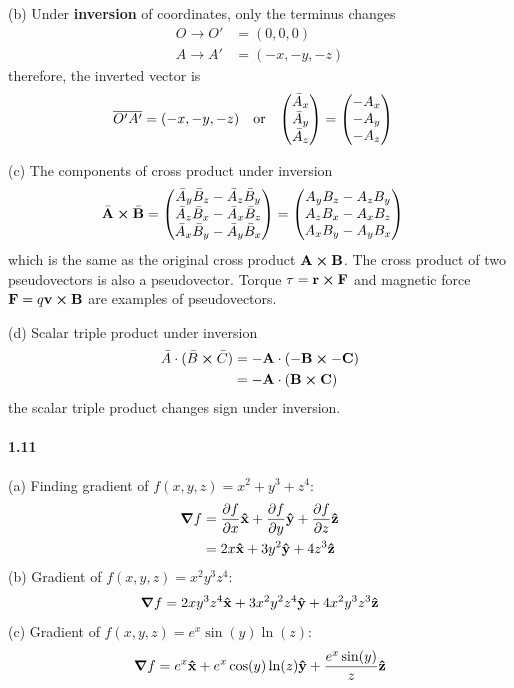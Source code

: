 \documentclass[../main.tex]{subfiles}
\begin{document}
(b) Under \textbf{inversion} of coordinates, only the terminus changes
\begin{align*}
    O \to O' &= (0, 0, 0) \\
    A \to A' &= (-x, -y, -z)
\end{align*}
therefore, the inverted vector is
\begin{align*}
    \overline{O'A'} = (-x, -y, -z) \qor \mqty(\bar{A}_x \\ \bar{A}_y \\ \bar{A}_z) &=
        \mqty(-A_x \\ -A_y \\ -A_z)
\end{align*}

(c) The components of cross product under inversion
\begin{align*}
    \bar{\vb{A}} \cross \bar{\vb{B}} &= 
    \begin{pmatrix}
        \bar{A}_y \bar{B}_z - \bar{A}_z \bar{B}_y \\
        \bar{A}_z \bar{B}_x - \bar{A}_x \bar{B}_z \\
        \bar{A}_x \bar{B}_y - \bar{A}_y \bar{B}_x
    \end{pmatrix}
    =
    \begin{pmatrix}
        A_y B_z - A_z B_y \\
        A_z B_x - A_x B_z \\
        A_x B_y - A_y B_x
    \end{pmatrix}
\end{align*}
which is the same as the original cross product $\vb{A} \cross \vb{B}$. The cross product of two
pseudovectors is also a pseudovector. Torque $\vb{\tau} = \vb{r} \cross \vb{F}$ and magnetic force
$\vb{F} = q \vb{v} \cross \vb{B}$ are examples of pseudovectors.

(d) Scalar triple product under inversion
\begin{align*}
    \bar{A} \cdot (\bar{B} \cross \bar{C}) &= -\vb{A} \cdot (-\vb{B} \cross -\vb{C}) \\
    &= -\vb{A} \cdot (\vb{B} \cross \vb{C})
\end{align*}
the scalar triple product changes sign under inversion.

\paragraph{1.11}
(a) Finding gradient of $f(x, y, z) = x^2 + y^3 + z^4$:
\begin{align*}
    \grad{f} &= \pdv{f}{x} \vu{x} + \pdv{f}{y} \vu{y} + \pdv{f}{z} \vu{z} \\
    &= 2x \vu{x} + 3y^2 \vu{y} + 4z^3 \vu{z}
\end{align*}
(b) Gradient of $f(x, y, z) = x^2y^3z^4$:
\begin{align*}
    \grad{f} = 2xy^3z^4 \vu{x} + 3x^2y^2z^4 \vu{y} + 4x^2y^3z^3 \vu{z}
\end{align*}
(c) Gradient of $f(x, y, z) = e^x \sin(y) \ln(z)$:
\begin{align*}
    \grad{f} = e^x \vu{x} + e^x \cos(y) \ln(z) \vu{y} + \frac{e^x \sin(y)}{z} \vu{z}
\end{align*}
\end{document}
